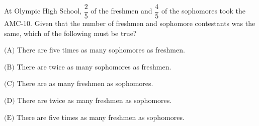 At Olympic High School, $\dfrac{2}{5}$ of the freshmen and $\dfrac{4}{5}$ of the sophomores took the AMC-10. Given that the number of freshmen and sophomore contestants was the same, which of the following must be true?



$\text{(A)}$ There are five times as many sophomores as freshmen.

$\text{(B)}$ There are twice as many sophomores as freshmen.

$\text{(C)}$ There are as many freshmen as sophomores.

$\text{(D)}$ There are twice as many freshmen as sophomores.

$\text{(E)}$ There are five times as many freshmen as sophomores.

